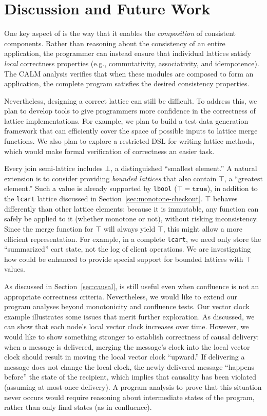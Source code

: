 \section{Discussion and Future Work}
\label{sec:discussion}
One key aspect of \lang is the way that it enables the \emph{composition} of
consistent components. Rather than reasoning about the consistency of an entire
application, the programmer can instead ensure that individual lattices satisfy
\emph{local} correctness properties (e.g., commutativity, associativity, and
idempotence). The CALM analysis verifies that when these modules are composed to
form an application, the complete program satisfies the desired consistency
properties.

Nevertheless, designing a correct lattice can still be difficult. To address
this, we plan to develop tools to give programmers more confidence in the
correctness of lattice implementations. For example, we plan to build a test
data generation framework that can efficiently cover the space of possible
inputs to lattice merge functions. We also plan to explore a restricted DSL for
writing lattice methods, which would make formal verification of correctness an
easier task.

Every join semi-lattice includes $\bot$, a distinguished ``smallest element.'' A natural
extension is to consider providing \emph{bounded lattices} that also contain   $\top$, a ``greatest
element.'' Such a value is already supported by \texttt{lbool} ($\top =
\mathtt{true}$), in addition to the \texttt{lcart} lattice discussed in
Section~\ref{sec:monotone-checkout}. $\top$ behaves differently than other
lattice elements: because it is immutable, any function can safely be applied to
it (whether monotone or not), without risking inconsistency. Since the merge
function for $\top$ will always yield $\top$, this might allow a more efficient
representation.  For example, in a complete \texttt{lcart}, we need only store the
``summarized'' cart state, not the log of client operations. We are
investigating how \lang could be enhanced to provide special support for
bounded lattices with $\top$ values.

As discussed in Section~\ref{sec:causal}, \lang is still useful even when
confluence is not an appropriate correctness criteria. Nevertheless, we would
like to extend our program analyses beyond monotonicity and confluence tests.
Our vector clock example illustrates some issues that merit further exploration.
As discussed, we can show that each node's local vector clock increases over
time. However, we would like to show something stronger to establish correctness
of causal delivery: when a message is delivered, merging the message's clock
into the local vector clock should result in moving the local vector clock
``upward.'' If delivering a message does not change the local clock, the newly
delivered message ``happens before'' the state of the recipient, which implies
that causality has been violated (assuming at-most-once delivery). A program
analysis to prove that this situation never occurs would require reasoning about
intermediate states of the program, rather than only final states (as in
confluence).

